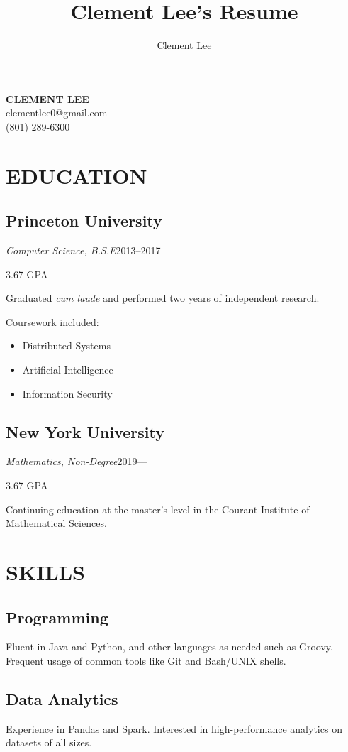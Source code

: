 \documentclass[11pt]{article}
\title{Clement Lee's Resume}
\author{Clement Lee}
\date{}
\begin{document}
{\Huge\textbf{CLEMENT LEE}}
\smallskip\\
clementlee0@gmail.com\\
(801) 289-6300\\

\begin{minipage}[t]{0.40\textwidth}
  \section*{\LARGE EDUCATION}
  \subsection*{Princeton University}
  \emph{Computer Science, B.S.E}\hfill 2013--2017
  
  \hfill 3.67 GPA
  \smallskip

  Graduated \emph{cum laude} and performed two years of independent research.

  Coursework included:
  \begin{itemize}
    \item Distributed Systems
    \item Artificial Intelligence
    \item Information Security
  \end{itemize}

  \medskip
  \subsection*{New York University}
  \emph{Mathematics, Non-Degree}\hfill2019---

  \hfill 3.67 GPA
  \smallskip
  
  Continuing education at the master's level in the Courant Institute of Mathematical Sciences. 

  \bigskip
  \section*{\LARGE SKILLS}

  \subsection*{Programming}
  Fluent in Java and Python, and other languages as needed such as Groovy.
  Frequent usage of common tools like Git and Bash/UNIX shells.

  \medskip
  \subsection*{Data Analytics}
  Experience in Pandas and Spark.
  Interested in high-performance analytics on datasets of all sizes.


\end{minipage}
\end{document}
